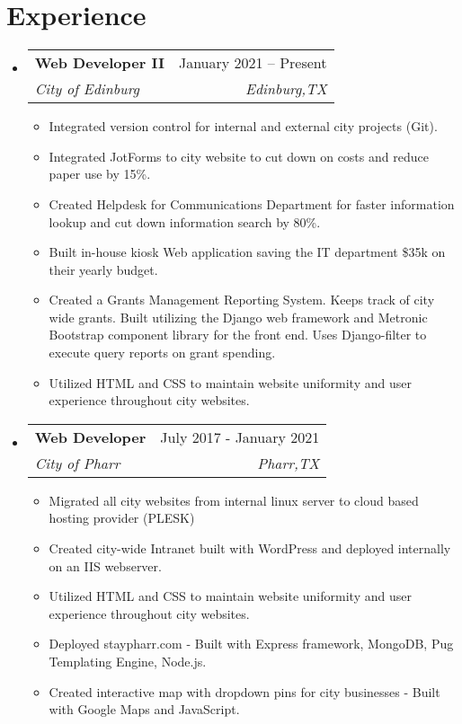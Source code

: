 \documentclass[letterpaper,11pt]{article}
\makeatletter
\newcommand{\resumeItem}[1]{
  \item\small{
    {#1 \vspace{-2pt}}
  }
}
\newcommand{\resumeSubheading}[4]{
  \vspace{-2pt}\item
    \begin{tabular*}{0.97\textwidth}[t]{l@{\extracolsep{\fill}}r}
      \textbf{#1} & #2 \\
      \textit{\small#3} & \textit{\small #4} \\
    \end{tabular*}\vspace{-7pt}
}
\newcommand{\resumeSubHeadingListStart}{\begin{itemize}[leftmargin=0.15in, label={}]}
\newcommand{\resumeSubHeadingListEnd}{\end{itemize}}
\newcommand{\resumeItemListStart}{\begin{itemize}}
\newcommand{\resumeItemListEnd}{\end{itemize}\vspace{-5pt}}
\makeatother
\begin{document}
\section{Experience}
  \resumeSubHeadingListStart
    \resumeSubheading
      {Web Developer II}{January 2021 -- Present}
      {City of Edinburg}{Edinburg,TX}
      \resumeItemListStart
        \resumeItem {Integrated version control for internal and external city projects (Git).}
        \resumeItem {Integrated JotForms to city website to cut down on costs and reduce paper use by 15\%.}  
        \resumeItem {Created Helpdesk for Communications Department for faster information lookup and cut down information search by 80\%.} 
        \resumeItem {Built in-house kiosk Web application saving the IT department \$35k on their yearly budget.} 
        \resumeItem {Created a Grants Management Reporting System. Keeps track of city wide grants. Built utilizing the Django web framework and Metronic Bootstrap component library for the front end. Uses Django-filter to execute query reports on grant spending. \\}
         \resumeItem {Utilized HTML and CSS to maintain website uniformity and user experience throughout city websites.\\}
      \resumeItemListEnd
    \resumeSubheading
      {Web Developer }{July 2017 - January 2021}
      {City of Pharr}{Pharr,TX}
      \resumeItemListStart
        \resumeItem {Migrated all city websites from internal linux server to cloud based hosting provider (PLESK)}
        \resumeItem { Created city-wide Intranet built with WordPress and deployed internally on an IIS webserver.}
         \resumeItem {Utilized HTML and CSS to maintain website uniformity and user experience throughout city websites.\\}
        \resumeItem {Deployed staypharr.com - Built with Express framework, MongoDB, Pug Templating Engine, Node.js.} 
        \resumeItem {Created interactive map with dropdown pins for city businesses - Built with Google Maps and JavaScript.} 
      \resumeItemListEnd
  \resumeSubHeadingListEnd
%
%
\end{document}
